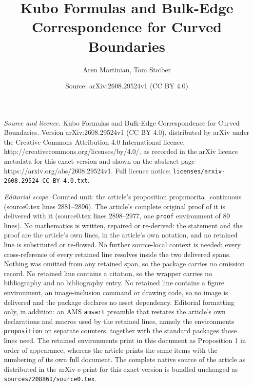 \documentclass[10pt,a4paper]{amsart}
\title{Kubo Formulas and Bulk-Edge Correspondence for Curved Boundaries}
\author{Aren Martinian, Tom Stoiber}
\date{Source: arXiv:2608.29524v1 (CC BY 4.0)}
\begin{document}
\maketitle

\noindent\emph{Source and licence.} Kubo Formulas and Bulk-Edge Correspondence for Curved Boundaries. Version arXiv:2608.29524v1 (CC BY 4.0), distributed by arXiv under the Creative Commons Attribution 4.0 International licence, http://creativecommons.org/licenses/by/4.0/, as recorded in the arXiv licence metadata for this exact version and shown on the abstract page https://arxiv.org/abs/2608.29524v1. Full licence notice: \texttt{licenses/arxiv-2608.29524-CC-BY-4.0.txt}.\par\smallskip

\noindent\textit{Editorial scope.} Counted unit: the article's proposition prop:morita\_continuous (source0.tex lines 2881--2896). The article's complete original proof of it is delivered with it (source0.tex lines 2898--2977, one \texttt{proof} environment of 80 lines). No mathematics is written, repaired or re-derived: the statement and the proof are the article's own lines, in the article's own notation, and no retained line is substituted or re-flowed.  No further source-local context is needed: every cross-reference of every retained line resolves inside the two delivered spans.  Nothing was omitted from any retained span, so the package carries no omission record.  No retained line contains a citation, so the wrapper carries no bibliography and no bibliography entry.  No retained line contains a figure environment, an image-inclusion command or drawing code, so no image is delivered and the package declares no asset dependency.  Editorial formatting only, in addition: an AMS \texttt{amsart} preamble that restates the article's own declarations and macros used by the retained lines, namely the environments \texttt{proposition} on separate counters, together with the standard packages those lines need.  The retained environments print in this document as Proposition 1 in order of appearance, whereas the article prints the same items with the numbering of its own full document.  The complete native source of the article as distributed in the arXiv e-print for this exact version is bundled unchanged as \texttt{sources/208861/source0.tex}.
\end{document}

